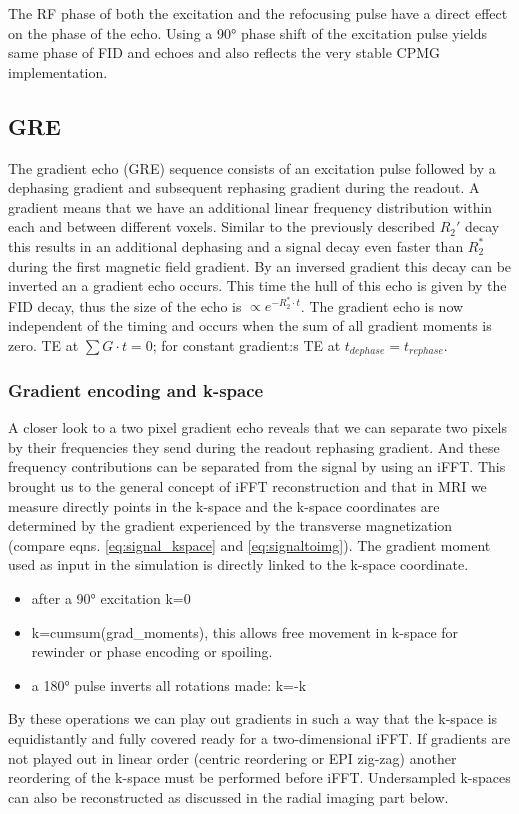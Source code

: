 \documentclass[a4paper,12pt]{extarticle}
\begin{document}
The RF phase of both the excitation and the refocusing pulse have a direct effect on the phase of the echo. Using a 90° phase shift of the excitation pulse yields same phase of FID and echoes and also reflects the very stable CPMG implementation.



\subsection{GRE}
The gradient echo (GRE) sequence consists of an excitation pulse followed by a dephasing gradient and subsequent rephasing gradient during the readout.
A gradient means that we have an additional linear frequency distribution within each and between different voxels. Similar to the previously described $R_2'$ decay this results in an additional dephasing and a signal decay even faster than $R_2^*$ during the first magnetic field gradient. By an inversed gradient this decay can be inverted an a gradient echo occurs.
This time the hull of this echo is given by the FID decay, thus the size of the echo is $\propto e^{-R_2^*\cdot t}$.
The gradient echo is now independent of the timing and occurs when the sum of all gradient moments is zero.
TE at  $\sum G\cdot t=0$; for constant gradient:s TE at $t_{dephase}=t_{rephase}$.

\subsubsection{Gradient encoding and k-space}
A closer look to a two pixel gradient echo reveals that we can separate two pixels by their frequencies they send during the readout rephasing gradient. And these frequency contributions can be separated from the signal by using an iFFT.
This brought us to the general concept of iFFT reconstruction and that in MRI we measure directly points in the k-space and the k-space coordinates are determined by the gradient experienced by the transverse magnetization (compare eqns. \eqref{eq:signal_kspace} and \eqref{eq:signaltoimg}). The gradient moment used as input in the simulation is directly linked to the k-space coordinate.
\begin{itemize}
\item after a 90° excitation k=0
\item k=cumsum(grad\_moments), this allows free movement in k-space for rewinder or phase encoding or spoiling.
\item a 180° pulse inverts all rotations made: k=-k
\end{itemize}
By these operations we can play out gradients in such a way that the k-space is equidistantly and fully covered ready for a two-dimensional iFFT. If gradients are not played out in linear order (centric reordering or EPI zig-zag) another reordering of the k-space must be performed before iFFT. Undersampled k-spaces can also be reconstructed as discussed in the radial imaging part below.
\end{document}
